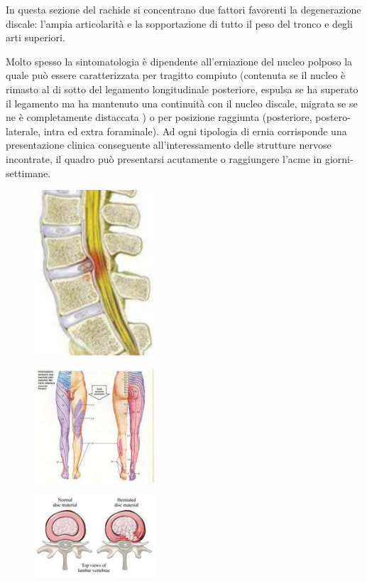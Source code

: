 In questa sezione del rachide si concentrano due fattori favorenti la degenerazione discale: l'ampia articolarità e la sopportazione di tutto il peso del tronco e degli arti superiori.

Molto spesso la sintomatologia è dipendente all'erniazione del nucleo polposo la quale può essere caratterizzata per tragitto compiuto (contenuta se il nucleo è rimasto al di sotto del legamento longitudinale posteriore, espulsa se ha superato il legamento ma ha
mantenuto una continuità con il nucleo discale, migrata se se ne è completamente distaccata ) o per posizione raggiunta (posteriore, postero-laterale, intra ed extra foraminale). Ad ogni tipologia di ernia corrisponde una presentazione clinica conseguente all'interessamento delle strutture nervose incontrate, il quadro può presentarsi acutamente o raggiungere l'acme in giorni-settimane.

\begin{figure}[!ht]
\centering
\includegraphics[width=0.4\textwidth]{020/image6.png}
\end{figure}

\begin{figure}[!ht]
\centering
\includegraphics[width=0.4\textwidth]{020/image7.png}
\end{figure}

\begin{figure}[!ht]
\centering
\includegraphics[width=0.4\textwidth]{020/image8.png}
\end{figure}

